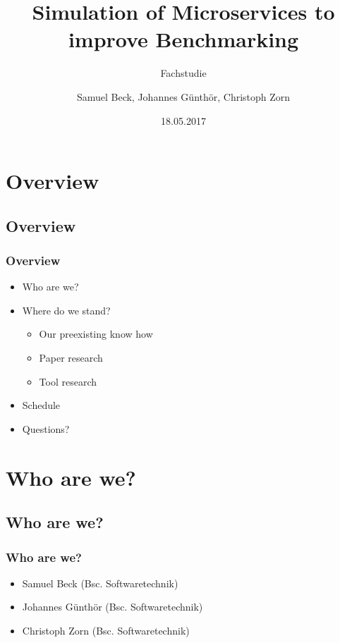 \documentclass[xcolor=dvipsnames]{beamer}
\title{Simulation of Microservices to improve Benchmarking}
\subtitle{Fachstudie}
\author{Samuel Beck, Johannes Günthör, Christoph Zorn}
\institute{RSS}
\date{18.05.2017}
\begin{document}
	
\begin{frame}
	
	\titlepage 
	
\end{frame}

\section{Overview}
\subsection{Overview}
\begin{frame}
	\frametitle{Overview}
	
	\begin{itemize}
		\item Who are we?
		\item Where do we stand?
		\begin{itemize}
			\item Our preexisting know how
			\item Paper research
			\item Tool research
		\end{itemize}
		\item Schedule
		\item Questions?
	\end{itemize}
	
\end{frame}

\section{Who are we?}
\subsection{Who are we?}
\begin{frame}
	\frametitle{Who are we?}
	
	\begin{itemize}
		\item Samuel Beck (Bsc. Softwaretechnik)\newline\newline
		\item Johannes Günthör (Bsc. Softwaretechnik)\newline\newline
		\item Christoph Zorn (Bsc. Softwaretechnik)\newline\newline
	\end{itemize}	
	
\end{frame}
\end{document}
